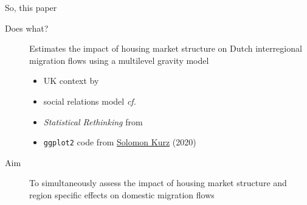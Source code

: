 \documentclass{beamer}
\begin{document}
\begin{frame}{So, this paper}
  \begin{description}
  \item[Does what?] \alert{Estimates} the impact of housing market
	  structure on Dutch interregional migration flows using a
	  \alert{multilevel} gravity model
    \begin{footnotesize}
	\begin{itemize}
	  \item \footnotesize UK context by \citet{congdon2010random}
	  \item \footnotesize social relations model \emph{cf.}
		\citet{koster2014food}
		\item \footnotesize \emph{Statistical Rethinking} from \citet{mcelreath2020statistical}
		\item \footnotesize \texttt{ggplot2} code from \href{https://bookdown.org/content/4857/}{Solomon Kurz} (2020) \newline
	\end{itemize}
  \end{footnotesize}
	\item[Aim] To \alert{simultaneously} assess the impact of housing market structure and region specific effects on domestic migration flows
  \end{description}
\end{frame}
\end{document}
